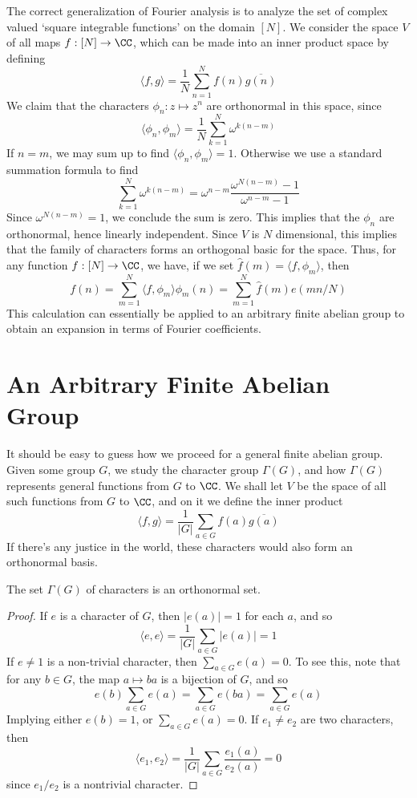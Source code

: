 The correct generalization of Fourier analysis is to analyze the set of complex valued `square integrable functions' on the domain $[N]$. We consider the space $V$ of all maps $f: [N] \to \CC$, which can be made into an inner product space by defining
%
\[ \langle f, g \rangle = \frac{1}{N} \sum_{n = 1}^N f(n) \overline{g(n)} \]
%
We claim that the characters $\phi_n: z \mapsto z^n$ are orthonormal in this space, since
%
\[ \langle \phi_n, \phi_m \rangle = \frac{1}{N} \sum_{k = 1}^N \omega^{k(n-m)} \]
%
If $n = m$, we may sum up to find $\langle \phi_n, \phi_m \rangle = 1$. Otherwise we use a standard summation formula to find
%
\[ \sum_{k = 1}^N \omega^{k(n-m)} = \omega^{n-m} \frac{\omega^{N(n-m)} - 1}{\omega^{n-m} -1} \]
%
Since $\omega^{N(n-m)} = 1$, we conclude the sum is zero. This implies that the $\phi_n$ are orthonormal, hence linearly independent. Since $V$ is $N$ dimensional, this implies that the family of characters forms an orthogonal basic for the space. Thus, for any function $f: [N] \to \CC$, we have, if we set $\widehat{f}(m) = \langle f, \phi_m \rangle$, then
%
\[ f(n) = \sum_{m = 1}^N \langle f, \phi_m \rangle \phi_m(n) = \sum_{m = 1}^N \widehat{f}(m) e(mn/N) \]
%
This calculation can essentially be applied to an arbitrary finite abelian group to obtain an expansion in terms of Fourier coefficients.

\section{An Arbitrary Finite Abelian Group}

It should be easy to guess how we proceed for a general finite abelian group. Given some group $G$, we study the character group $\Gamma(G)$, and how $\Gamma(G)$ represents general functions from $G$ to $\CC$. We shall let $V$ be the space of all such functions from $G$ to $\CC$, and on it we define the inner product
%
\[ \langle f, g \rangle = \frac{1}{|G|} \sum_{a \in G} f(a) \overline{g(a)} \]
%
If there's any justice in the world, these characters would also form an orthonormal basis.

\begin{theorem}
    The set $\Gamma(G)$ of characters is an orthonormal set.
\end{theorem}
\begin{proof}
    If $e$ is a character of $G$, then $|e(a)| = 1$ for each $a$, and so
    \[ \langle e, e \rangle = \frac{1}{|G|} \sum_{a \in G} |e(a)| = 1 \]
    If $e \neq 1$ is a non-trivial character, then $\sum_{a \in G} e(a) = 0$. To see this, note that for any $b \in G$, the map $a \mapsto ba$ is a bijection of $G$, and so
    \[ e(b) \sum_{a \in G} e(a) = \sum_{a \in G} e(ba) = \sum_{a \in G} e(a) \]
    Implying either $e(b) = 1$, or $\sum_{a \in G} e(a) = 0$. If $e_1 \neq e_2$ are two characters, then
    \[ \langle e_1, e_2 \rangle = \frac{1}{|G|} \sum_{a \in G} \frac{e_1(a)}{e_2(a)} = 0 \]
    since $e_1/e_2$ is a nontrivial character.
\end{proof}

